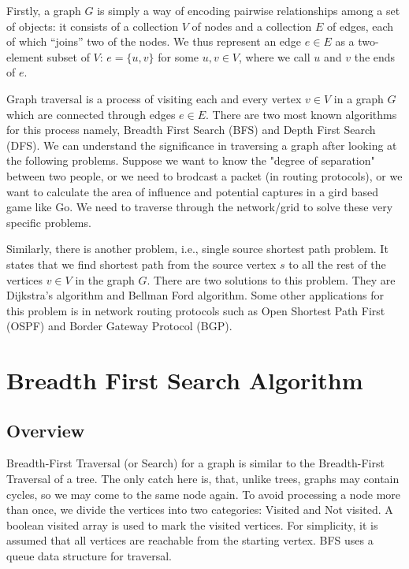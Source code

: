 \documentclass[lettersize,journal]{IEEEtran}
\begin{document}
Firstly, a graph \( G \) is simply a way of encoding pairwise relationships among a set of objects: it consists of a collection \( V \) of nodes and a collection \( E \) of edges, each of which ``joins'' two of the nodes. We thus represent an edge \( e \in E \) as a two-element subset of \( V \): \( e = \{u, v\} \) for some \( u, v \in V \), where we call \( u \) and \( v \) the ends of \( e \)\cite{kleinberg2005algorithm}. 

Graph traversal is a process of visiting each and every vertex \(v \in V \) in a graph \( G \) which are connected through edges \(e \in E \). There are two most known algorithms for this process namely, Breadth First Search (BFS) and Depth First Search (DFS). We can understand the significance in traversing a graph after looking at the following problems. Suppose we want to know the "degree of separation" between two people, or we need to brodcast a packet (in routing protocols), or we want to calculate the area of influence and potential captures in a gird based game like Go. We need to traverse through the network/grid to solve these very specific problems. 

Similarly, there is another problem, i.e., single source shortest path problem. It states that we find shortest path from the source vertex \(s\) to all the rest of the vertices \(v \in V \) in the graph \( G \). There are two solutions to this problem. They are Dijkstra's algorithm and Bellman Ford algorithm. Some other applications for this problem is in network routing protocols such as Open Shortest Path First (OSPF) and Border Gateway Protocol (BGP).

\section{Breadth First Search Algorithm}
\subsection{Overview}

Breadth-First Traversal (or Search) for a graph is similar to the Breadth-First Traversal of a tree. The only catch here is, that, unlike trees, graphs may contain cycles, so we may come to the same node again. To avoid processing a node more than once, we divide the vertices into two categories: Visited and Not visited. A boolean visited array is used to mark the visited vertices. For simplicity, it is assumed that all vertices are reachable from the starting vertex. BFS uses a queue data structure for traversal.
\end{document}
